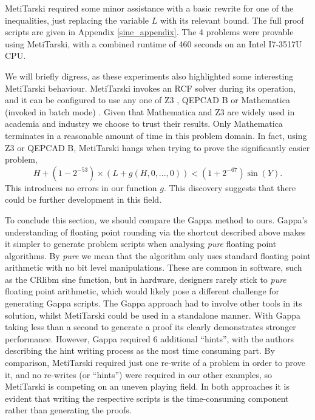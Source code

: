\documentclass{fac}
\begin{document}
MetiTarski required some minor assistance with a basic rewrite for one of the inequalities, just replacing the variable $L$ with its relevant bound. The full proof scripts are given in Appendix \ref{sine_appendix}. The 4 problems were provable using MetiTarski, with a combined runtime of 460 seconds on an Intel I7-3517U CPU. 

We will briefly digress, as these experiments also highlighted some interesting MetiTarski behaviour. MetiTarski invokes an RCF solver during its operation, and it can be configured to use any one of Z3 \cite{de2008z3}, QEPCAD B \cite{brown2003qepcad} or Mathematica (invoked in batch mode) \cite{Mathematica}. Given that Mathematica and Z3 are widely used in academia and industry we choose to trust their results. Only Mathematica terminates in a reasonable amount of time in this problem domain. In fact, using Z3 or QEPCAD B, MetiTarski hangs when trying to prove the significantly easier problem,
\begin{equation}
    H + (1-2^{-53})\times(L+g(H,0,...,0)) < (1+2^{-67})\sin{(Y)}.
\end{equation}
This introduces no errors in our function $g$. This discovery suggests that there could be further development in this field. 

To conclude this section, we should compare the Gappa method to ours. Gappa's understanding of floating point rounding via the shortcut described above makes it simpler to generate problem scripts when analysing \textit{pure} floating point algorithms. By \textit{pure} we mean that the algorithm only uses standard floating point arithmetic with no bit level manipulations. These are common in software, such as the CRlibm sine function, but in hardware, designers rarely stick to \textit{pure} floating point arithmetic, which would likely pose a different challenge for generating Gappa scripts. The Gappa approach had to involve other tools in its solution, whilst MetiTarski could be used in a standalone manner. With Gappa taking less than a second to generate a proof its clearly demonstrates stronger performance. However, Gappa required 6 additional ``hints'', with the authors describing the hint writing process as the most time consuming part. By comparison, MetiTarski required just one re-write of a problem in order to prove it, and no re-writes (or ``hints'') were required in our other examples, so MetiTarski is competing on an uneven playing field. In both approaches it is evident that writing the respective scripts is the time-consuming component rather than generating the proofs.
\end{document}
